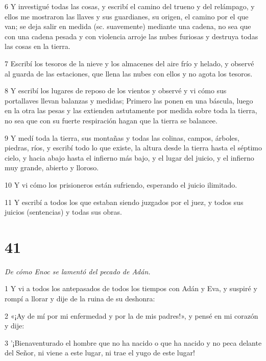 \par 6 Y investigué todas las cosas, y escribí el camino del trueno y del relámpago, y ellos me mostraron las llaves y sus guardianes, su origen, el camino por el que van; se deja salir en medida (sc. suavemente) mediante una cadena, no sea que con una cadena pesada y con violencia arroje las nubes furiosas y destruya todas las cosas en la tierra.

\par 7 Escribí los tesoros de la nieve y los almacenes del aire frío y helado, y observé al guarda de las estaciones, que llena las nubes con ellos y no agota los tesoros.

\par 8 Y escribí los lugares de reposo de los vientos y observé y vi cómo sus portallaves llevan balanzas y medidas; Primero las ponen en una báscula, luego en la otra las pesas y las extienden astutamente por medida sobre toda la tierra, no sea que con su fuerte respiración hagan que la tierra se balancee.

\par 9 Y medí toda la tierra, sus montañas y todas las colinas, campos, árboles, piedras, ríos, y escribí todo lo que existe, la altura desde la tierra hasta el séptimo cielo, y hacia abajo hasta el infierno más bajo, y el lugar del juicio, y el infierno muy grande, abierto y lloroso.

\par 10 Y vi cómo los prisioneros están sufriendo, esperando el juicio ilimitado.

\par 11 Y escribí a todos los que estaban siendo juzgados por el juez, y todos sus juicios (sentencias) y todas sus obras.

\chapter{41}

\par \textit{De cómo Enoc se lamentó del pecado de Adán.}

\par 1 Y vi a todos los antepasados ​​de todos los tiempos con Adán y Eva, y suspiré y rompí a llorar y dije de la ruina de su deshonra:

\par 2 «¡Ay de mí por mi enfermedad y por la de mis padres!», y pensé en mi corazón y dije:

\par 3 '¡Bienaventurado el hombre que no ha nacido o que ha nacido y no peca delante del Señor, ni viene a este lugar, ni trae el yugo de este lugar!

